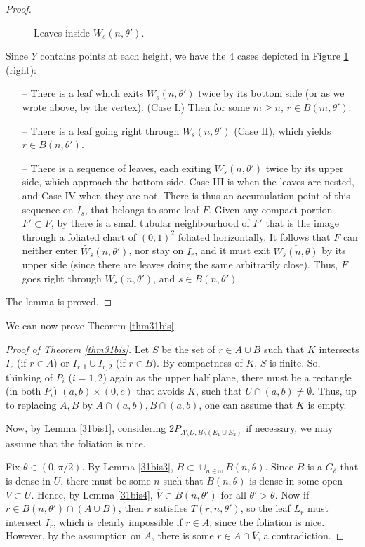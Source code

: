\documentclass{amsart}
\begin{document}
\begin{proof}
\begin{figure}[h]
\centering
    \caption{\label{figures8-9} Leaves inside $W_s(n,\theta')$.}
\end{figure}

Since $Y$ contains points at each height, we have the $4$ cases depicted in Figure \ref{figures8-9} (right): 
\begin{itemize}
     \item[--] There is a leaf which exits $W_s(n,\theta')$ twice by its bottom side (or as we wrote above, by the vertex). (Case I.) Then for some $m\ge n$, $r\in B(m,\theta')$.
     \item[--] There is a leaf going right through $W_s(n,\theta')$ (Case II), which yields $r\in B(n,\theta')$.
     \item[--] There is a sequence of leaves, each exiting $W_s(n,\theta')$ twice by its upper side, which approach the bottom side. Case III is when the leaves are nested, and Case IV when they are not. There is thus an accumulation point of this sequence on $I_s$, that belongs to some leaf $F$. Given any compact portion $F'\subset F$, by \cite[Lemma 2.3]{BGG} there is a small tubular neighbourhood of $F'$ that is the image through a foliated chart of $(0,1)^2$ foliated horizontally. It follows that $F$ can neither enter ${\widetilde{{W_s}}}(n,\theta')$, nor stay on $I_r$, and it must exit ${\overline{{W_s(n,\theta)}}}$ by its upper side (since there are leaves doing the same arbitrarily close). Thus, $F$ goes right through $W_s(n,\theta')$, and $s\in B(n,\theta')$.            
   \end{itemize} 
   The lemma is proved.
\end{proof}

We can now prove Theorem \ref{thm31bis}.

\begin{proof}[Proof of Theorem \ref{thm31bis}]
Let $S$ be the set of $r\in A\cup B$ such that $K$ intersects $I_r$ (if $r\in A$) or $I_{r,1} \cup I_{r,2}$ (if $r\in B$). By compactness of $K$, $S$ is finite. So, thinking of $P_i$ ($i=1,2$) again as the upper half plane, there must be a rectangle (in both $P_i$) $(a,b)\times (0,c)$ that avoids $K$, such that $U\cap (a,b)\not=\emptyset$. Thus, up to replacing $A,B$ by $A\cap (a,b), B\cap (a,b)$, one can assume that $K$ is empty.  
  
Now, by Lemma \ref{31bis1}, considering $2P_{A\setminus D, B\setminus (E_1\cup E_2)}$ if necessary, we may assume that the foliation is nice.

Fix $\theta\in(0,\pi/2)$. By Lemma \ref{31bis3}, $B\subset \cup_{n\in\omega}B(n,\theta)$. Since $B$ is a $G_\delta$ that is dense in $U$, there must be some $n$ such that $B(n,\theta)$ is dense in some open $V\subset U$. Hence, by Lemma \ref{31bis4}, ${\overline{{V}}}\subset B(n,\theta')$ for all $\theta' >\theta$. Now if $r\in B(n,\theta')\cap(A\cup B)$, then $r$ satisfies $T(r,n,\theta')$, so the leaf $L_r$ must intersect $I_r$, which is clearly impossible if $r\in A$, since the foliation is nice. However, by the assumption on $A$, there is some $r\in A\cap {\overline{{V}}}$, a contradiction.
\end{proof}
\end{document}
